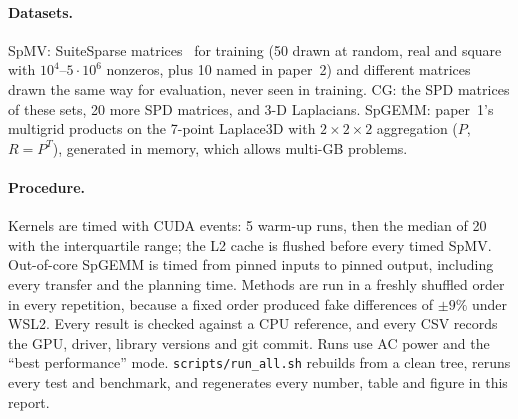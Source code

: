 \paragraph{Datasets.} SpMV:  SuiteSparse matrices~\cite{davis2011suitesparse} for training (50 drawn at
random, real and square with $10^4$--$5\cdot10^6$ nonzeros, plus 10 named in paper~2) and 
different matrices drawn the same way for evaluation, never seen in training. CG: the SPD matrices of these sets, 20 more
SPD matrices, and 3-D Laplacians. SpGEMM: paper~1's multigrid products on the 7-point Laplace3D with $2\times2\times2$
aggregation ($P$, $R=P^T$), generated in memory, which allows multi-GB problems.

\paragraph{Procedure.} Kernels are timed with CUDA events: 5 warm-up runs, then the median of 20 with the
interquartile range; the L2 cache is flushed before every timed SpMV. Out-of-core SpGEMM is timed from pinned inputs to
pinned output, including every transfer and the planning time. Methods are run in a freshly shuffled order in every
repetition, because a fixed order produced fake differences of $\pm9\%$ under WSL2. Every result is checked against a
CPU reference, and every CSV records the GPU, driver, library versions and git commit. Runs use AC power and the
``best performance'' mode. \texttt{scripts/run\_all.sh} rebuilds from a clean tree, reruns every test and benchmark,
and regenerates every number, table and figure in this report.

\begin{table}[t]
\centering\small
\caption{Platform measurements of the RTX~4050 laptop (\texttt{results/platform/uvm\_probe.csv}).}\label{tab:platform}
\end{table}
